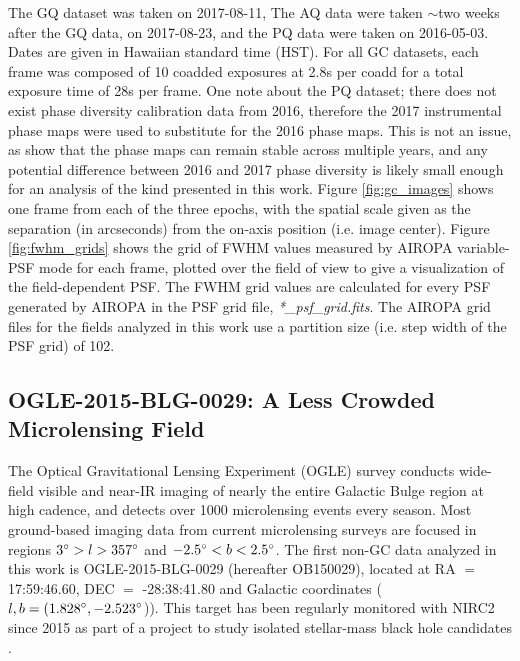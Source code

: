 \documentclass[]{spie}  %
\begin{document}
The GQ dataset was taken on 2017-08-11, The AQ data were taken $\sim$two weeks after the GQ data, on 2017-08-23, and the PQ data were taken on 2016-05-03. Dates are given in Hawaiian standard time (HST). For all GC datasets, each frame was composed of 10 coadded exposures at 2.8s per coadd for a total exposure time of 28s per frame. One note about the PQ dataset; there does not exist phase diversity calibration data from 2016, therefore the 2017 instrumental phase maps were used to substitute for the 2016 phase maps. This is not an issue, as \cite{Ciurlo:inprep} show that the phase maps can remain stable across multiple years, and any potential difference between 2016 and 2017 phase diversity is likely small enough for an analysis of the kind presented in this work. Figure \ref{fig:gc_images} shows one frame from each of the three epochs, with the spatial scale given as the separation (in arcseconds) from the on-axis position (i.e. image center). Figure \ref{fig:fwhm_grids} shows the grid of FWHM values measured by AIROPA variable-PSF mode for each frame, plotted over the field of view to give a visualization of the field-dependent PSF. The FWHM grid values are calculated for every PSF generated by AIROPA in the PSF grid file, \textit{*\_psf\_grid.fits}. The AIROPA grid files for the fields analyzed in this work use a partition size (i.e. step width of the PSF grid) of 102. 


 
\subsection{OGLE-2015-BLG-0029: A Less Crowded Microlensing Field} \label{sec:ogle-data}
The Optical Gravitational Lensing Experiment (OGLE) survey \cite{udalski:1992a} conducts wide-field visible and near-IR imaging of nearly the entire Galactic Bulge region at high cadence, and detects over 1000 microlensing events every season. Most ground-based imaging data from current microlensing surveys are focused in regions $3\degree > l > 357\degree$ and $-2.5\degree < b < 2.5\degree$. The first non-GC data analyzed in this work is OGLE-2015-BLG-0029 (hereafter OB150029), located at RA $=$ 17:59:46.60, DEC $=$ -28:38:41.80 and Galactic coordinates ($l,b = (1.828\degree, -2.523\degree$)). This target has been regularly monitored with NIRC2 since 2015 as part of a project to study isolated stellar-mass black hole candidates \citep{lu:inprep}.
\end{document}
